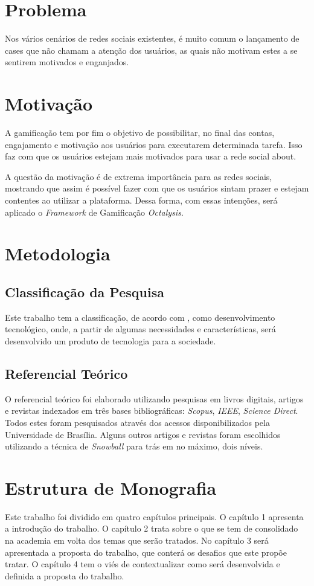 \section{Problema}
Nos vários cenários de redes sociais existentes, é muito comum o lançamento de cases
que não chamam a atenção dos usuários, as quais não motivam estes a se sentirem
motivados e enganjados.
\section{Motivação}
A gamificação tem por fim o objetivo de 
possibilitar, no final das contas, engajamento e motivação aos usuários para
executarem determinada tarefa. Isso faz com que os usuários estejam mais
motivados para usar a rede social about. 

A questão da motivação é de extrema importância para as redes sociais, mostrando
que assim é possível fazer com que os usuários sintam prazer e estejam
contentes ao utilizar a plataforma. Dessa forma, com essas intenções,
será aplicado o \textit{Framework} de Gamificação \textit{Octalysis}.

\section{Metodologia}
\subsection{Classificação da Pesquisa}
\label{sub:classifica_o_da_pesquisa}
Este trabalho tem a classificação, de acordo com \cite{gil2010metodos}, como desenvolvimento tecnológico,
onde, a partir de algumas necessidades e características, será desenvolvido um produto
de tecnologia para a sociedade.

\subsection{Referencial Teórico}
\label{sub:referencial_te_rico}
O referencial teórico foi elaborado utilizando pesquisas em livros digitais, artigos e
revistas indexados em três bases bibliográficas: \textit{Scopus}, \textit{IEEE}, \textit{Science Direct}. Todos estes
foram pesquisados através dos acessos disponibilizados pela Universidade de Brasília.
Alguns outros artigos e revistas foram escolhidos utilizando a técnica de
\textit{Snowball} para trás em no máximo, dois níveis.


\section{Estrutura de Monografia}
Este trabalho foi dividido em quatro capítulos principais. O capítulo 1 apresenta a introdução
do trabalho. O capítulo 2 trata sobre o que se tem de consolidado na academia em volta
dos temas que serão tratados. No capítulo 3 será apresentada a proposta do trabalho, que conterá
os desafios que este propõe tratar. O capítulo 4 tem o viés de contextualizar como será
desenvolvida e definida a proposta do trabalho.
